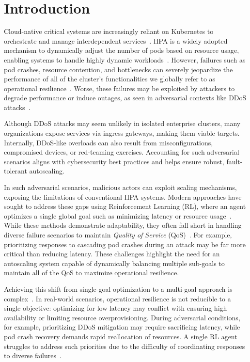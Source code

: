 
\section{Introduction}
\label{sec:introduction}

Cloud-native critical systems are increasingly reliant on Kubernetes to orchestrate and manage interdependent services~\cite{Pahl2019}. HPA is a widely adopted mechanism to dynamically adjust the number of pods based on resource usage, enabling systems to handle highly dynamic workloads~\cite{Toka2020}. However, failures such as pod crashes, resource contention, and bottlenecks can severely jeopardize the performance of all of the cluster's functionalities we globally refer to as operational resilience~\cite{burns2016borg}. Worse, these failures may be exploited by attackers to degrade performance or induce outages, as seen in adversarial contexts like DDoS attacks~\cite{David2021}.

Although DDoS attacks may seem unlikely in isolated enterprise clusters, many organizations expose services via ingress gateways, making them viable targets. Internally, DDoS-like overloads can also result from misconfigurations, compromised devices, or red-teaming exercises. Accounting for such adversarial scenarios aligns with cybersecurity best practices and helps ensure robust, fault-tolerant autoscaling.

In such adversarial scenarios, malicious actors can exploit scaling mechanisms, exposing the limitations of conventional HPA systems. Modern approaches have sought to address these gaps using Reinforcement Learning (RL), where an agent optimizes a single global goal such as minimizing latency or resource usage~\cite{Gari2021}. While these methods demonstrate adaptability, they often fall short in handling diverse failure scenarios to maintain \textit{Quality of Service} (QoS)~\cite{Liu2024}. For example, prioritizing responses to cascading pod crashes during an attack may be far more critical than reducing latency. These challenges highlight the need for an autoscaling system capable of dynamically balancing multiple sub-goals to maintain all of the QoS to maximize operational resilience.

Achieving this shift from single-goal optimization to a multi-goal approach is complex~\cite{Shoham2009MAS}. In real-world scenarios, operational resilience is not reducible to a single objective: optimizing for low latency may conflict with ensuring high availability or limiting resource overprovisioning. During adversarial conditions, for example, prioritizing DDoS mitigation may require sacrificing latency, while pod crash recovery demands rapid reallocation of resources. A single RL agent struggles to address such priorities due to the difficulty of coordinating responses to diverse failures~\cite{Jennings1998}.

